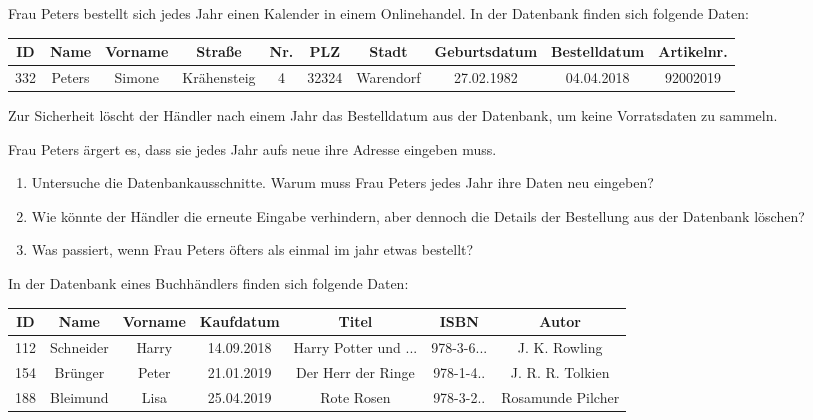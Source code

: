 \documentclass[10pt, a5paper,landscape]{scrartcl}
\begin{document}
\clearpage

Frau Peters bestellt sich jedes Jahr einen Kalender in einem Onlinehandel. In der Datenbank finden sich folgende Daten:

{\footnotesize
\begin{tabular}{|*{10}{c|}}\hline
	\rowcolor{ngb.tabelle.kopf.hg} ID & Name & Vorname & Straße & Nr. & PLZ & Stadt & Geburtsdatum & Bestelldatum & Artikelnr. \\ \hline
	332 & Peters & Simone & Krähensteig & 4 & 32324 & Warendorf & 27.02.1982 & 04.04.2018 & 92002019 \\\hline
\end{tabular}}

Zur Sicherheit löscht der Händler nach einem Jahr das Bestelldatum aus der Datenbank, um keine Vorratsdaten zu sammeln.

Frau Peters ärgert es, dass sie jedes Jahr aufs neue ihre Adresse eingeben muss.

\vspace{1em}
\begin{aufgabe}
\begin{enumerate}
	\item Untersuche die Datenbankausschnitte. Warum muss Frau Peters jedes Jahr ihre Daten neu eingeben?
	\item Wie könnte der Händler die erneute Eingabe verhindern, aber dennoch die Details der Bestellung aus der Datenbank löschen?
	\item Was passiert, wenn Frau Peters öfters als einmal im jahr etwas bestellt? 
\end{enumerate}
\end{aufgabe}

\clearpage

In der Datenbank eines Buchhändlers finden sich folgende Daten:

{\footnotesize
\begin{tabular}{|*{7}{c|}}\hline
	\rowcolor{ngb.tabelle.kopf.hg} ID & Name & Vorname & Kaufdatum & Titel & ISBN & Autor\\ \hline
	112 & Schneider & Harry & 14.09.2018 & Harry Potter und ... & 978-3-6... & J. K. Rowling \\\hline
	154 & Brünger & Peter & 21.01.2019 & Der Herr der Ringe & 978-1-4.. & J. R. R. Tolkien \\\hline
	188 & Bleimund & Lisa & 25.04.2019 & Rote Rosen & 978-3-2.. & Rosamunde Pilcher \\\hline
\end{tabular}}
\end{document}
